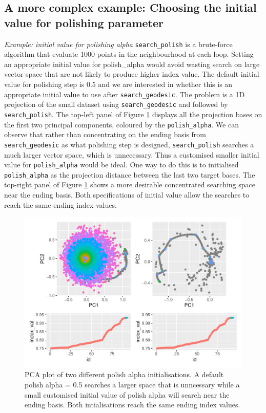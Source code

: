 \documentclass[12pt]{article}
\begin{document}
\hypertarget{a-more-complex-example-choosing-the-initial-value-for-polishing-parameter}{%
\subsection{A more complex example: Choosing the initial value for
polishing
parameter}\label{a-more-complex-example-choosing-the-initial-value-for-polishing-parameter}}

\emph{Example: initial value for polishing alpha}
\texttt{search\_polish} is a brute-force algorithm that evaluate 1000
points in the neighbourhood at each loop. Setting an appropriate initial
value for polish\_alpha would avoid wasting search on large vector space
that are not likely to produce higher index value. The default initial
value for polishing step is 0.5 and we are interested in whether this is
an appropriate initial value to use after \texttt{search\_geodesic}. The
problem is a 1D projection of the small dataset using
\texttt{search\_geodesic} and followed by \texttt{search\_polish}. The
top-left panel of Figure \ref{polish-alpha} displays all the projection
bases on the first two principal components, coloured by the
\texttt{polish\_alpha}. We can observe that rather than concentrating on
the ending basis from \texttt{search\_geodesic} as what polishing step
is designed, \texttt{search\_polish} searches a much larger vector
space, which is unnecessary. Thus a customised smaller initial value for
\texttt{polish\_alpha} would be ideal. One way to do this is to
initialised \texttt{polish\_alpha} as the projection distance between
the last two target bases. The top-right panel of Figure
\ref{polish-alpha} shows a more desirable concentrated searching space
near the ending basis. Both specifications of initial value allow the
searches to reach the same ending index values.

\begin{figure}
\centering
\includegraphics{paper_files/figure-latex/polish-alpha-1.pdf}
\caption{\label{polish-alpha}PCA plot of two different polish alpha
initialisations. A default polish alpha = 0.5 searches a larger space
that is unncessary while a small customised initial value of polish
alpha will search near the ending basis. Both intialisations reach the
same ending index values.}
\end{figure}
\end{document}
